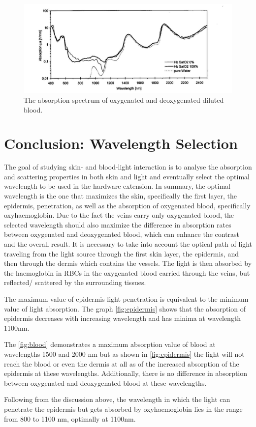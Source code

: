\begin{figure}[H]
\centering
\includegraphics[scale=0.5]{figures/blood.JPG}
\caption[The absorption spectrum of oxygenated and deoxygenated diluted blood]{The absorption spectrum of oxygenated and deoxygenated diluted blood.}\label{fig:blood}
\end{figure}

\section{Conclusion: Wavelength Selection}
The goal of studying skin- and blood-light interaction is to analyse the absorption and scattering properties in both skin and light and eventually select the optimal wavelength to be used in the hardware extension. In summary, the optimal wavelength is the one that maximizes the skin, specifically the first layer, the epidermis, penetration, as well as the absorption of oxygenated blood, specifically oxyhaemoglobin. Due to the fact the veins carry only oxygenated blood, the selected wavelength should also maximize the difference in absorption rates between oxygenated and deoxygenated blood, which can enhance the contrast and the overall result. It is necessary to take into account the optical path of light traveling from the light source through the first skin layer, the epidermis, and then through the dermis which contains the vessels.  The light is then absorbed by the haemoglobin in RBCs in the oxygenated blood carried through the veins, but reflected/ scattered by the surrounding tissues.

The maximum value of epidermis light penetration is equivalent to the minimum value of light absorption. The graph \autoref{fig:epidermis} shows that the absorption of epidermis decreases with increasing wavelength and has minima at wavelength 1100nm.

The \autoref{fig:blood} demonstrates a maximum absorption value of blood at wavelengths 1500 and 2000 nm but as shown in \autoref{fig:epidermis} the light will not reach the blood or even the dermis at all as of the increased absorption of the epidermis at these wavelengths. Additionally, there is no difference in absorption between oxygenated and deoxygenated blood at these wavelengths.

Following from the discussion above, the wavelength in which the light can penetrate the epidermis but gets absorbed by oxyhaemoglobin lies in the range from 800 to 1100 nm, optimally at 1100nm.